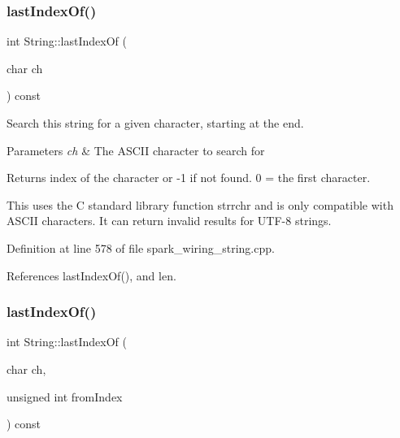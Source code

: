 \mbox{\label{class_string_a63a465c7d1e67129b04cf4693b756e5b}} 
\subsubsection{\texorpdfstring{last\+Index\+Of()}{lastIndexOf()}\hspace{0.1cm}{\footnotesize\ttfamily [1/4]}}
{\footnotesize\ttfamily int String\+::last\+Index\+Of (\begin{DoxyParamCaption}\item[{char}]{ch }\end{DoxyParamCaption}) const}



Search this string for a given character, starting at the end. 


\begin{DoxyParams}{Parameters}
{\em ch} & The A\+S\+C\+II character to search for\\
\hline
\end{DoxyParams}
\begin{DoxyReturn}{Returns}
index of the character or -\/1 if not found. 0 = the first character.
\end{DoxyReturn}
This uses the C standard library function strrchr and is only compatible with A\+S\+C\+II characters. It can return invalid results for U\+T\+F-\/8 strings. 

Definition at line 578 of file spark\+\_\+wiring\+\_\+string.\+cpp.



References last\+Index\+Of(), and len.

\mbox{\label{class_string_af9b32bb5cf68844c04792b4368f69883}} 
\subsubsection{\texorpdfstring{last\+Index\+Of()}{lastIndexOf()}\hspace{0.1cm}{\footnotesize\ttfamily [2/4]}}
{\footnotesize\ttfamily int String\+::last\+Index\+Of (\begin{DoxyParamCaption}\item[{char}]{ch,  }\item[{unsigned int}]{from\+Index }\end{DoxyParamCaption}) const}



